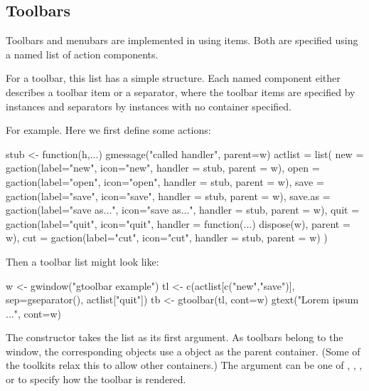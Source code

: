 


\subsection{Toolbars}
\label{sec:gWidgets-toolbars}
Toolbars and menubars are implemented in  using
 items. Both are specified using a named
list of action components. 

For a toolbar, this list has a simple structure. Each named component
either describes a toolbar item or a separator, where the toolbar
items are specified by  instances and separators by
 instances with no container specified.

For example. Here we first define some actions:
\begin{Schunk}
\begin{Sinput}
 stub <- function(h,...) gmessage("called handler", parent=w)
 actlist = list(
   new = gaction(label="new", icon="new", 
     handler = stub, parent = w),
   open = gaction(label="open", icon="open", 
     handler = stub, parent = w),
   save = gaction(label="save", icon="save", 
     handler = stub, parent = w),
   save.as = gaction(label="save as...", icon="save as...", 
     handler = stub, parent = w),
   quit = gaction(label="quit", icon="quit", 
     handler = function(...) dispose(w), parent = w),
   cut = gaction(label="cut", icon="cut", 
     handler = stub, parent = w)
   )
 
\end{Sinput}
\end{Schunk}

Then a toolbar list might look like:
\begin{Schunk}
\begin{Sinput}
 w <- gwindow("gtoolbar example")
 tl <- c(actlist[c("new","save")], 
         sep=gseparator(), 
         actlist["quit"])
 tb <- gtoolbar(tl, cont=w)
 gtext("Lorem ipsum ...", cont=w)
\end{Sinput}
\end{Schunk}


The  constructor takes the list as its first
argument.  As toolbars belong to the window, the corresponding
 objects use a  object as the
parent container. (Some of the toolkits relax this to allow other containers.)  The argument
 can be one of , ,
, or  to specify how the toolbar is
rendered. 



